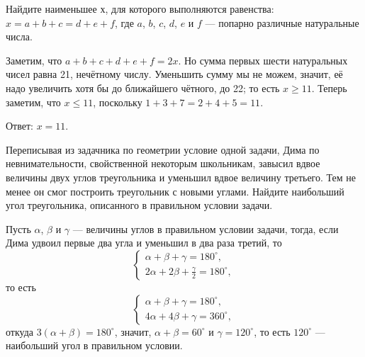 
\begin{itemize}
\itC Найдите наименьшее $х$, для которого выполняются равенства:
$x = a+b+c = d+e+f$, где $a$, $b$, $c$, $d$, $e$ и $f$ --- попарно различные натуральные числа.

\itr Заметим, что $a+b+c+d+e+f=2x$. Но сумма первых шести натуральных чисел равна 21, нечётному числу.
Уменьшить сумму мы не можем, значит, её надо увеличить хотя бы до ближайшего чётного, до 22;
то есть $x \ge 11$. Теперь заметим, что $x \le 11$, поскольку
$1 + 3 +7 = 2 + 4 + 5 = 11$.

Ответ: $x=11$.
\end{itemize}

\begin{itemize}
\itB Переписывая из задачника по геометрии условие одной задачи, Дима по невнимательности, свойственной некоторым школьникам, завысил вдвое величины двух углов треугольника и уменьшил вдвое величину третьего. Тем не менее он смог построить треугольник с новыми углами. Найдите наибольший угол треугольника, описанного в правильном условии задачи.

\itr
 Пусть $\alpha$, $\beta$ и $\gamma$ --- величины углов в правильном условии задачи, тогда, если 
Дима удвоил первые два угла и уменьшил в два раза третий, то
$$
\begin{cases}
\alpha+\beta+\gamma=180^{\circ},\\
2\alpha+2\beta+\frac{\gamma}{2}=180^{\circ},
\end{cases}
$$
то есть
$$
\begin{cases}
\alpha+\beta+\gamma=180^{\circ},\\
4\alpha+4\beta+\gamma=360^{\circ},
\end{cases}
$$
откуда $3(\alpha+\beta)=180^{\circ}$, значит, $\alpha+\beta=60^\circ$ и $\gamma=120^{\circ}$, то есть $120^{\circ}$ --- наибольший угол в правильном условии.

\end{itemize}
